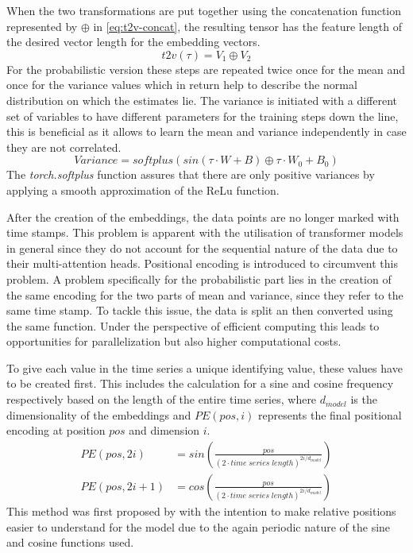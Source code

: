 \documentclass{article}
\begin{document}
When the two transformations are put together using the concatenation function represented by $\oplus$ in \ref{eq:t2v-concat}, the resulting tensor has the feature length of the desired vector length for the embedding vectors. 
\begin{equation}\label{eq:t2v-concat}
    t2v(\tau) = V_1 \oplus V_2
\end{equation}
For the probabilistic version these steps are repeated twice once for the mean and once for the variance values which in return help to describe the normal distribution on which the estimates lie. The variance is initiated with a different set of variables to have different parameters for the training steps down the line, this is beneficial as it allows to learn the mean and variance independently in case they are not correlated.
\begin{equation}\label{eq:t2v-var}
    Variance = softplus \left(sin(\tau \cdot W + B) \oplus \tau \cdot W_0 + B_0 \right)
\end{equation}
The \textit{torch.softplus} function assures that there are only positive variances by applying a smooth approximation of the ReLu function. 

After the creation of the embeddings, the data points are no longer marked with time stamps. This problem is apparent with the utilisation of transformer models in general since they do not account for the sequential nature of the data due to their multi-attention heads. Positional encoding is introduced to circumvent this problem. A problem specifically for the probabilistic part lies in the creation of the same encoding for the two parts of mean and variance, since they refer to the same time stamp. To tackle this issue, the data is split an then converted using the same function. Under the perspective of efficient computing this leads to opportunities for parallelization but also higher computational costs.

To give each value in the time series a unique identifying value, these values have to be created first. This includes the calculation for a sine and cosine frequency respectively based on the length of the entire time series, where $d_{model}$ is the dimensionality of the embeddings and $PE(pos, i)$ represents the final positional encoding at position $pos$ and dimension $i$.
\begin{align}\label{eq:pos-encoding}
    PE(pos, 2i) &= sin \left( \frac{pos}{(2 \cdot time \; series \; length)^{2i / d_{model}}} \right) \\
    PE(pos, 2i + 1) &= cos \left( \frac{pos}{(2 \cdot time \; series \; length)^{2i / d_{model}}} \right)
\end{align}
This method was first proposed by \cite{vanilla-transformer} with the intention to make relative positions easier to understand for the model due to the again periodic nature of the sine and cosine functions used.
\end{document}
